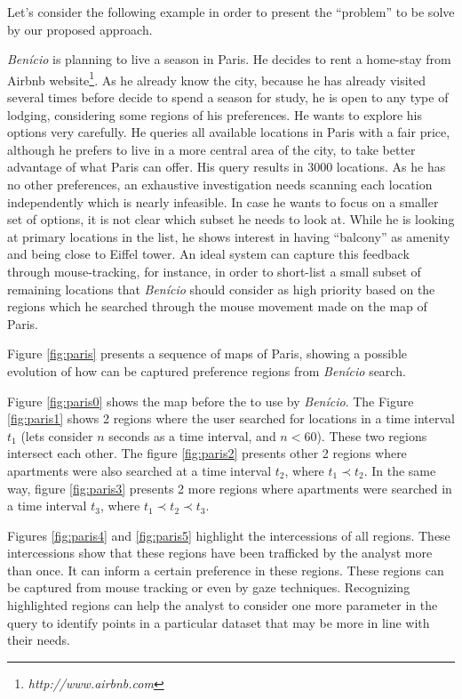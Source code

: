 \documentclass[runningheads,a4paper]{llncs}
\begin{document}
Let's consider the following example in order to present the ``problem'' to be solve by our proposed approach. 

\begin{example}
\label{ex:benicio}
\textit{Ben\'icio} is planning to live a season in Paris. He decides to rent a home-stay from Airbnb website\footnote{\it http://www.airbnb.com}. As he already know the city, because he has already visited several times before decide to spend a season for study, he is open to any type of lodging, considering some regions of his preferences. He wants to explore his options very carefully. He queries all available locations in Paris with a fair price, although he prefers to live in a more central area of the city, to take better advantage of what Paris can offer. His query results in 3000 locations. As he has no other preferences, an exhaustive investigation needs scanning each location independently which is nearly infeasible. In case he wants to focus on a smaller set of options, it is not clear which subset he needs to look at. While he is looking at primary locations in the list, he shows interest in having ``balcony'' as amenity and being close to Eiffel tower. An ideal system can capture this feedback through mouse-tracking, for instance, in order to short-list a small subset of remaining locations that \textit{Ben\'icio} should consider as high priority based on the regions  which he searched through the mouse movement made on the map of Paris. 
\end{example}


Figure \ref{fig:paris} presents a sequence of maps of Paris, showing a possible  evolution of how can be captured preference regions from \textit{Ben\'icio} search.

Figure \ref{fig:paris0} shows the map before the to use by  \textit{Ben\'icio}. The Figure \ref{fig:paris1} shows 2 regions where the user searched for locations in a time interval $t_1$ (lets consider $n$ seconds as a time interval, and $n < 60$). These two regions intersect each other. The figure \ref{fig:paris2} presents other 2 regions where apartments were also searched at a time interval $t_2$, where $t_1 \prec t_2$. In the same way, figure \ref{fig:paris3}  presents 2 more regions where apartments were searched in a time interval $t_3$, where $t_1 \prec t_2 \prec t_ 3$.

Figures \ref{fig:paris4} and \ref{fig:paris5} highlight the intercessions of all regions. These intercessions show that these regions have been trafficked by the analyst more than once. It can inform a certain preference in these regions. These regions can be captured from mouse tracking or even by gaze techniques. Recognizing highlighted regions can help the analyst to consider one more parameter in the query to identify points in a particular dataset that may be more in line with their needs.
\end{document}
